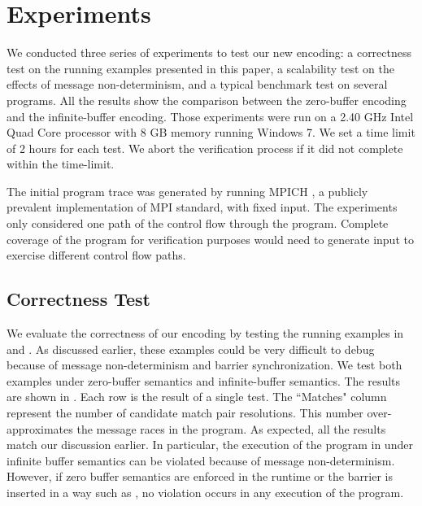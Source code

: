 \section{Experiments}
We conducted three series of experiments to test our new encoding: a correctness test on the running examples presented in this paper, a scalability test on the effects of message non-determinism, and a typical benchmark test on several programs. All the results show the comparison between the zero-buffer encoding and the infinite-buffer encoding.  Those experiments were run on a 2.40 GHz Intel Quad Core processor with 8 GB memory running Windows 7. We set a time limit of 2 hours for each test. We abort the verification process if it did not complete within the time-limit. 

The initial program trace was generated by running MPICH \cite{mpich}, a publicly prevalent implementation of MPI standard, with fixed input. The experiments only considered one path of the control flow through the program. Complete coverage of the program for verification purposes would need to generate input to exercise different control flow paths. 

\subsection{Correctness Test}
We evaluate the correctness of our encoding by testing the running examples in  and . As discussed earlier, these examples could be very difficult to debug because of message non-determinism and barrier synchronization. We test both examples under zero-buffer semantics and infinite-buffer semantics. The results are shown in . Each row is the result of a single test. The ``Matches" column represent the number of candidate match pair resolutions.  This number over-approximates the message races in the program. As expected, all the results match our discussion earlier. In particular, the execution of the program in  under infinite buffer semantics can be violated because of message non-determinism. However, if zero buffer semantics are enforced in the runtime or the barrier is inserted in a way such as , no violation occurs in any execution of the program. 

